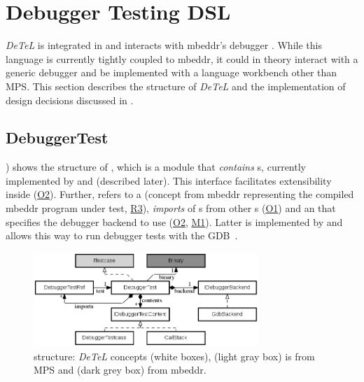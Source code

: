 \section{Debugger Testing DSL}

\emph{DeTeL} is integrated in  and interacts
with mbeddr's debugger . While this language is currently tightly
coupled to mbeddr, it could in theory interact with a generic debugger 
and be implemented with a language workbench other than \ac{MPS}.
This section describes the structure of \emph{DeTeL} and the
implementation of design decisions discussed in .

\subsection{DebuggerTest}

) shows the structure of 
, which is a module that \emph{contains} 
s, currently implemented by 
 and  (described later). This interface
facilitates extensibility inside
 (\hyperref[O2]{O2}). Further,  refers to 
a  (concept from mbeddr representing the compiled mbeddr program
under test, \hyperref[R3]{R3}), \emph{imports} of s from other 
s (\hyperref[O1]{O1}) and an
 that specifies the debugger backend to use
(\hyperref[O2]{O2}, \hyperref[M1]{M1}). Latter is implemented by
 and allows this way to run debugger tests with the
\ac{GDB}~\cite{gdb}.

\begin{figure}[h]
  \vspace{-2mm}
  \centering
    \includegraphics[width=8.5cm]{./figures/graph2-1.png} 
    \vspace{-2mm}
    \caption{ structure: \emph{DeTeL} concepts 
    (white boxes),  (light gray box) is from
    \ac{MPS} and  (dark grey box) from mbeddr.}
  \label{fig:DebuggerTestStructure}
  \vspace{-2mm}
\end{figure}

